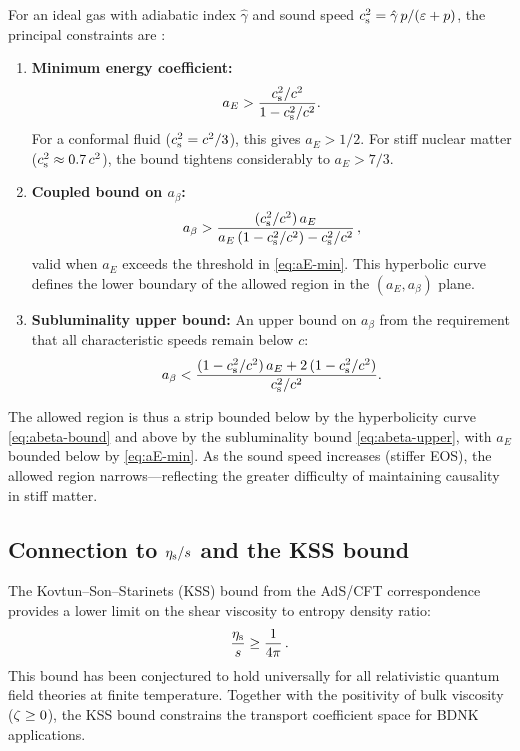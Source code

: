 For an ideal gas with adiabatic index $\hat{\gamma}$ and sound speed
$c_{\mathrm{s}}^2 = \hat{\gamma}\, p/(\varepsilon + p)$, the principal constraints
are \citep{BemficaDNK2023,HoultKovtun2022kinetic}:
\begin{enumerate}
\item \textbf{Minimum energy coefficient:}
  \begin{equation}
    a_E > \frac{c_{\mathrm{s}}^2/c^2}{1 - c_{\mathrm{s}}^2/c^2}.
    \label{eq:aE-min}
  \end{equation}
  For a conformal fluid ($c_{\mathrm{s}}^2 = c^2/3$), this gives $a_E > 1/2$.
  For stiff nuclear matter ($c_{\mathrm{s}}^2 \approx 0.7\, c^2$), the bound
  tightens considerably to $a_E > 7/3$.

\item \textbf{Coupled bound on $a_\beta$:}
  \begin{equation}
    a_\beta > \frac{(\cs^2/c^2)\, a_E}%
      {a_E\,(1 - \cs^2/c^2) - \cs^2/c^2}\,,
    \label{eq:abeta-bound}
  \end{equation}
  valid when $a_E$ exceeds the threshold in \eqref{eq:aE-min}.
  This hyperbolic curve defines the lower boundary of the allowed
  region in the $(a_E, a_\beta)$ plane.

\item \textbf{Subluminality upper bound:} An upper bound on $a_\beta$
  from the requirement that all characteristic speeds remain below $c$:
  \begin{equation}
    a_\beta < \frac{(1 - \cs^2/c^2)\, a_E + 2\,(1 - \cs^2/c^2)}%
      {\cs^2/c^2}.
    \label{eq:abeta-upper}
  \end{equation}
\end{enumerate}

The allowed region is thus a strip bounded below by the hyperbolicity
curve \eqref{eq:abeta-bound} and above by the subluminality
bound \eqref{eq:abeta-upper}, with $a_E$ bounded below by
\eqref{eq:aE-min}.  As the sound speed increases (stiffer EOS),
the allowed region narrows---reflecting the greater difficulty of
maintaining causality in stiff matter.

\subsection{Connection to $\eta_{\mathrm{s}}/s$ and the KSS bound}
\label{sec:kss-connection}

The Kovtun--Son--Starinets (KSS) bound \citep{KSS2005} from the
AdS/CFT correspondence provides a lower limit on the shear viscosity
to entropy density ratio:
\begin{equation}
  \frac{\eta_{\mathrm{s}}}{s} \ge \frac{1}{4\pi}\,.
  \label{eq:kss-bound}
\end{equation}
This bound has been conjectured to hold universally for all
relativistic quantum field theories at finite temperature.  Together
with the positivity of bulk viscosity ($\zeta \ge 0$), the KSS
bound constrains the transport coefficient space for BDNK applications.

